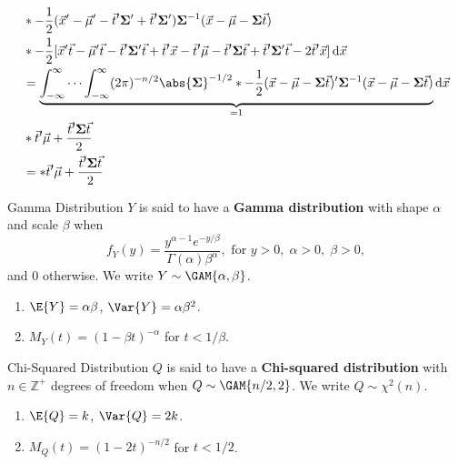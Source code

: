 \begin{Theorem}{}{}
\begin{align*}
         & \exp*{-\frac{1}{2}(\Vector{x}'-\Vector{\mu}'-\Vector{t}'\Matrix{\Sigma}'+\Vector{t}'\Matrix{\Sigma}')\Matrix{\Sigma}^{-1}(\Vector{x}-\Vector{\mu}-\Matrix{\Sigma}\Vector{t})}                                                                                              \\
         & \exp*{-\frac{1}{2}[\Vector{x}'\Vector{t}-\Vector{\mu}'\Vector{t}-\Vector{t}'\Matrix{\Sigma}'\Vector{t}+\Vector{t}'\Vector{x}-\Vector{t}'\Vector{\mu}-\Vector{t}'\Matrix{\Sigma}\Vector{t}+\Vector{t}'\Matrix{\Sigma}'\Vector{t}-2 \Vector{t}'\Vector{x}]}\odif{\Vector{x}} \\
         & =\underbrace{\int_{-\infty}^{\infty}\cdots\int_{-\infty}^{\infty}(2\pi)^{-n/2}\abs{\Matrix{\Sigma}}^{-1/2}
        \exp*{-\frac{1}{2}(\Vector{x}-\Vector{\mu}-\Matrix{\Sigma}\Vector{t})' \Matrix{\Sigma}^{-1}(\Vector{x}-\Vector{\mu}-\Matrix{\Sigma}\Vector{t})}}_{=1}\odif{\Vector{x}}                                                                                                        \\
         & \exp*{\Vector{t}'\Vector{\mu}+\frac{\Vector{t}' \Matrix{\Sigma}\Vector{t}}{2}}                                                                                                                                                                                             \\
         & =\exp*{\Vector{t}'\Vector{\mu}+\frac{\Vector{t}' \Matrix{\Sigma}\Vector{t}}{2}}
    \end{align*}
\end{Theorem}
\begin{Remark}{Gamma Distribution}{}
    $ Y $ is said to have a \textbf{Gamma distribution}
    with shape $ \alpha $ and scale $ \beta $ when
    \[ f_Y(y)=\frac{y^{\alpha-1}e^{-y/\beta}}{\Gamma(\alpha)\beta^\alpha},\text{ for $y>0,\; \alpha>0,\;\beta>0$}, \]
    and $ 0 $ otherwise. We write $ Y \sim \GAM{\alpha,\beta} $.
    \begin{enumerate}[(1)]
        \item $ \E{Y}=\alpha\beta $, $ \Var{Y}=\alpha\beta^2 $.
        \item $ M_Y(t)=(1-\beta t)^{-\alpha} $ for $ t<1/\beta $.
    \end{enumerate}
\end{Remark}
\begin{Remark}{Chi-Squared Distribution}{}
    $ Q $ is said to have a \textbf{Chi-squared distribution} with
    $ n\in\mathbb{Z}^+ $ degrees of freedom when
    $ Q \sim \GAM{n/2,2} $. We write $ Q \sim \chi^2(n) $.
    \begin{enumerate}[(1)]
        \item $ \E{Q}=k $, $ \Var{Q}=2k $.
        \item $ M_Q(t)=(1-2t)^{-n/2} $ for $ t<1/2 $.
    \end{enumerate}
\end{Remark}
